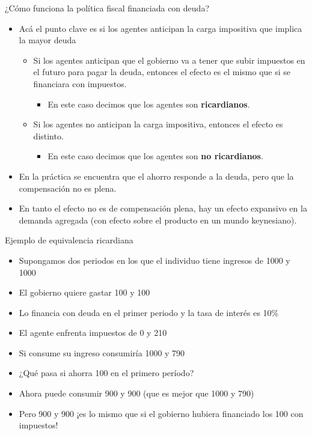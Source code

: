 \documentclass{beamer}
\begin{document}
\begin{frame}{¿Cómo funciona la política fiscal financiada con deuda?}
    \begin{itemize}
        \item Acá el punto clave es si los agentes anticipan la carga impositiva que implica la mayor deuda
        \begin{itemize}
            \item Si los agentes anticipan que el gobierno va a tener que subir impuestos en el futuro para pagar la deuda, entonces el efecto es el mismo que si se financiara con impuestos.
            \begin{itemize}
                \item En este caso decimos que los agentes son \textbf{ricardianos}.
            \end{itemize}
            \item Si los agentes no anticipan la carga impositiva, entonces el efecto es distinto.
            \begin{itemize}
                \item En este caso decimos que los agentes son \textbf{no ricardianos}.
            \end{itemize}
        \end{itemize}
        \item En la práctica se encuentra que el ahorro responde a la deuda, pero que la compensación no es plena.
        \item En tanto el efecto no es de compensación plena, hay un efecto expansivo en la demanda agregada (con efecto sobre el producto en un mundo keynesiano).
    \end{itemize}
\end{frame}

\begin{frame}{Ejemplo de equivalencia ricardiana}
    
    \begin{itemize}
        \item Supongamos dos periodos en los que el individuo tiene ingresos de 1000 y 1000
        \item El gobierno quiere gastar 100 y 100 
        \item Lo financia con deuda en el primer periodo y la tasa de interés es 10\%
        \item El agente enfrenta impuestos de 0 y 210
        \item Si consume su ingreso consumiría 1000 y 790 
        \item ¿Qué pasa si ahorra 100 en el primero período?
        \item Ahora puede consumir 900 y 900 (que es mejor que 1000 y 790)
        \item Pero 900 y 900 ¡es lo mismo que si el gobierno hubiera financiado los 100 con impuestos! 
    \end{itemize}
    
\end{frame}
\end{document}
